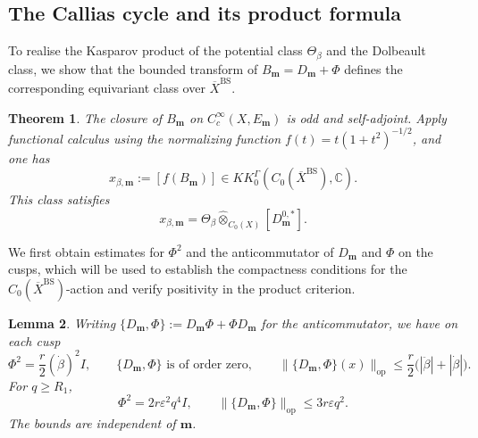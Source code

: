 \documentclass[11pt]{article}
\theoremstyle{definition}
\theoremstyle{plain}
\numberwithin{equation}{section}
\newtheorem{theorem}{Theorem}[section]
\newtheorem{lemma}[theorem]{Lemma}
\newcommand{\BS}{\mathrm{BS}}
\begin{document}
\subsection{The Callias cycle and its product formula}
\label{subsec:cycle}

To realise the Kasparov product of the potential class
$\Theta_\beta$ and the Dolbeault class, we show that the bounded
transform of $B_{\boldsymbol m}=D_{\boldsymbol m}+\Phi$ defines
the corresponding equivariant class over $\overline X^{\BS}$.

\begin{theorem}\label{thm:cycle}
The closure of $B_{\boldsymbol m}$ on $C_c^\infty(X,E_{\boldsymbol m})$
is odd and self-adjoint. Apply functional calculus using the normalizing function $f(t)=t(1+t^2)^{-1/2}$, and one has
\begin{equation}\label{eq:class}
 x_{\beta,\boldsymbol m}:=[f(B_{\boldsymbol m})]
       \in KK_0^\Gamma(C_0(\overline X^{\BS}),\mathbb C).
\end{equation}
This class satisfies
\begin{equation}\label{eq:product}
 x_{\beta,\boldsymbol m}
   =\Theta_\beta\widehat\otimes_{C_0(X)}
      [D_{\boldsymbol m}^{0,*}].
\end{equation}
\end{theorem}

We first obtain estimates for $\Phi^2$ and
the anticommutator
of $D_{\boldsymbol m}$ and $\Phi$ on the cusps, which will be used to establish the compactness
conditions for the $C_0(\overline X^{\BS})$-action and verify
positivity in the product criterion.

\begin{lemma}\label{lem:clifford}
Writing
$\{D_{\boldsymbol m},\Phi\}
:=D_{\boldsymbol m}\Phi+\Phi D_{\boldsymbol m}$
for the anticommutator, we have on each cusp
\begin{equation}\label{eq:potential-estimate}
 \Phi^2=\frac r2(\dot\beta)^2I,\qquad
 \{D_{\boldsymbol m},\Phi\}\text{ is of order zero},\qquad
 \|\{D_{\boldsymbol m},\Phi\}(x)\|_{\mathrm{op}}
    \leq\frac r2\bigl(|\ddot\beta|+|\dot\beta|\bigr).
\end{equation}
For $q\geq R_1$,
\begin{equation}\label{eq:deep-estimate}
 \Phi^2=2r\varepsilon^2q^4I,\qquad
 \|\{D_{\boldsymbol m},\Phi\}\|_{\mathrm{op}}\leq3r\varepsilon q^2.
\end{equation}
The bounds are independent of $\boldsymbol m$.
\end{lemma}
\end{document}
